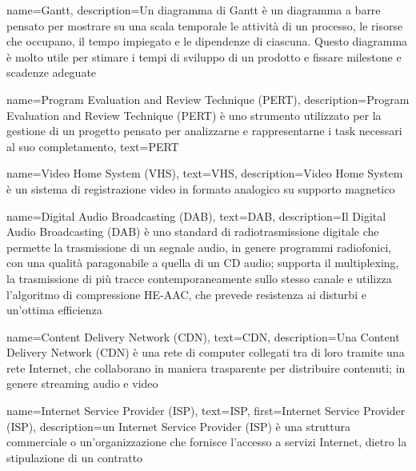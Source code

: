 {
    name={Gantt},
    description={Un diagramma di Gantt è un diagramma a barre pensato per mostrare su una scala temporale le attività di un processo, le risorse che occupano, il tempo impiegato e le dipendenze di ciascuna. Questo diagramma è molto utile per stimare i tempi di sviluppo di un prodotto e fissare milestone e scadenze adeguate}
}

{
    name={Program Evaluation and Review Technique (PERT)},
    description={Program Evaluation and Review Technique (PERT) è uno strumento utilizzato per la gestione di un progetto pensato per analizzarne e rappresentarne i task necessari al suo completamento},
    text={PERT}
}

{
    name={Video Home System (VHS)},
    text={VHS},
    description={Video Home System è un sistema di registrazione video in formato analogico su supporto magnetico}
}

{
    name={Digital Audio Broadcasting (DAB)},
    text={DAB},
    description={Il Digital Audio Broadcasting (DAB) è uno standard di radiotrasmissione digitale che permette la trasmissione di un segnale audio, in genere programmi radiofonici, con una qualità paragonabile a quella di un CD audio; supporta il multiplexing, la trasmissione di più tracce contemporaneamente sullo stesso canale e utilizza l'algoritmo di compressione HE-AAC, che prevede resistenza ai disturbi e un'ottima efficienza}
}

{
    name={Content Delivery Network (CDN)},
    text={CDN},
    description={Una Content Delivery Network (CDN) è una rete di computer collegati tra di loro tramite una rete Internet, che collaborano in maniera trasparente per distribuire contenuti; in genere streaming audio e video}
}

{
    name={Internet Service Provider (ISP)},
    text={ISP},
    first={Internet Service Provider (ISP)},
    description={un Internet Service Provider (ISP) è una struttura commerciale o un'organizzazione che fornisce l'accesso a servizi Internet, dietro la stipulazione di un contratto}
}